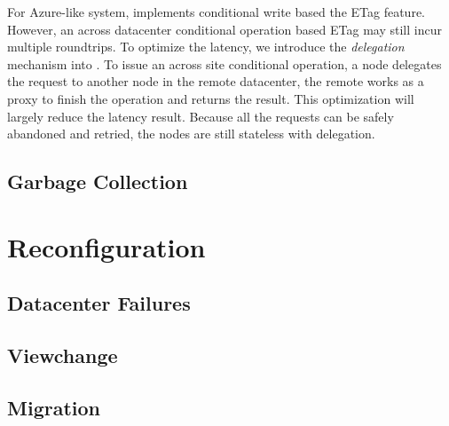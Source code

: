 For Azure-like system, {\name} implements conditional write based the ETag feature.
However, an across datacenter conditional operation based ETag may still incur multiple
roundtrips. To optimize the latency, we introduce the \emph{delegation} mechanism
into {\name}. To issue an across site conditional operation, a {\name} node delegates the
request to another {\name} node in the remote datacenter, the remote {\name} works as
a proxy to finish the operation and returns the result. This optimization will largely
reduce the latency result. Because all the requests can be safely abandoned and retried,
the {\name} nodes are still stateless with delegation.

\subsection{Garbage Collection}


\section{Reconfiguration}


\subsection{Datacenter Failures}

\subsection{Viewchange}

\subsection{Migration}



